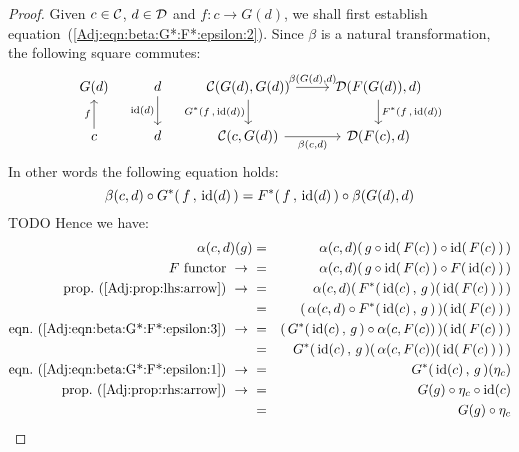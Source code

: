 \noindent
\begin{proof}
    Given $c\in\mbox{$\cal C$}$, $d\in\mbox{$\cal D$}$ and $f:c\to G(d)$, we shall first establish 
    equation~(\ref{Adj:eqn:beta:G*:F*:epsilon:2}). Since $\beta$
    is a natural transformation, the following square commutes:
        \[
            \begin{tikzcd}
                G(d)
                &d\arrow[d,swap, "{\rm id}(d)"]
                &\Cat(G(d),G(d))\arrow[r, "\beta\mbox{$(G(d),d)$}"]
                \arrow[d, swap,"G^{*}\mbox{$(f\,,\,{\rm id}(d))$}"]
                &\Dat(F(G(d)),d)
                \arrow[d, "F^{*}\mbox{$(f\,,\,{\rm id}(d))$}"]
                \\
                c\arrow[u, "f"]
                &d
                &\Cat(c,G(d))\arrow[r, swap, "\beta\mbox{$(c,d)$}"]
                &\Dat(F(c),d)
            \end{tikzcd}
        \]
    In other words the following equation holds: 
        \begin{equation}\label{Adj:eqn:beta:G*:F*:epsilon:3}
            \beta(c,d)\circ G^{*}(\,f\,,\,\mbox{\rm id}(d)\,) = 
            F^{*}(\,f\,,\,\mbox{\rm id}(d)\,)\circ\beta(G(d),d)
        \end{equation}
    TODO
    Hence we have:
        \begin{eqnarray*}\alpha(c,d)(g)
            &=&\alpha(c,d)(\,g\circ\id(\,F(c)\,)\circ\id(\,F(c)\,)\,)\\
            \mbox{$F$ functor}\ \to\ 
            &=&\alpha(c,d)(\,g\circ\id(\,F(c)\,)\circ F(\,\id(c)\,)\,)\\
            \mbox{prop.~(\ref{Adj:prop:lhs:arrow})}\ \to\ 
            &=&\alpha(c,d)(\,F^{*}(\,\id(c)\,,\,g\,)(\,\id(\,F(c)\,)\,)\,)\\
            &=&(\,\alpha(c,d)\circ F^{*}(\,\id(c)\,,\,g\,)\,)(\,\id(\,F(c)\,)\,)\\
            \mbox{eqn.~(\ref{Adj:eqn:beta:G*:F*:epsilon:3})}\ \to\ 
            &=&(\,G^{*}(\,\id(c)\,,\,g\,)\circ\alpha(c,F(c))\,)(\,\id(\,F(c)\,)\,)\\
            &=&G^{*}(\,\id(c)\,,\,g\,)(\,\alpha(c,F(c))(\,\id(\,F(c)\,)\,)\,)\\
            \mbox{eqn.~(\ref{Adj:eqn:beta:G*:F*:epsilon:1})}\ \to\ 
            &=&G^{*}(\,\id(c)\,,\,g\,)(\eta_{c})\\
            \mbox{prop.~(\ref{Adj:prop:rhs:arrow})}\ \to\ 
            &=&G(g)\circ\eta_{c}\circ\id(c)\\
            &=&G(g)\circ\eta_{c}\\

\end{eqnarray*}
\end{proof}
